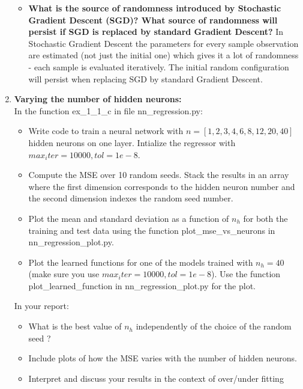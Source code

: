 \documentclass[a4paper]{article}
\begin{document}
\begin{enumerate}[label=(\alph*)]
\begin{itemize}
\item \textbf{What is the source of randomness introduced by Stochastic Gradient Descent (SGD)? What source of randomness will persist if SGD is replaced by standard Gradient Descent?}
\newline \newline
In Stochastic Gradient Descent the parameters for every sample observation are estimated (not just the initial one) which gives it a lot of randomness - each sample is evaluated iteratively.
The initial random configuration will persist when replacing SGD by standard Gradient Descent.

\end{itemize}

\newpage

\item \textbf{Varying the number of hidden neurons:}\\
	In the function ex\_1\_1\_c in file nn\_regression.py:
    \begin{itemize}
        \item Write code to train a neural network with $n = [1, 2, 3, 4, 6, 8, 12, 20, 40]$ hidden neurons on one layer. Intialize the regressor with $max_iter=10000, tol=1e-8$.
        \item Compute the MSE over 10 random seeds. Stack the results in an array where the first dimension corresponds to the hidden neuron number and the second dimension indexes the random seed number.
        \item Plot the mean and standard deviation as a function of $n_h$ for both the training and test data using the function plot\_mse\_vs\_neurons in nn\_regression\_plot.py.
		\item Plot the learned functions for one of the models trained with $n_h = 40$ (make sure you use $max_iter=10000, tol=1e-8$). Use the function plot\_learned\_function in nn\_regression\_plot.py for the plot.
    \end{itemize}
    In your report:
    \begin{itemize}
      \item What is the best value of $n_h$ independently of the choice of the random seed ?
      \item Include plots of how the MSE varies with the number of hidden neurons.
      \item Interpret and discuss your results in the context of over/under fitting
    \end{itemize}
    

\end{enumerate}
\end{document}
